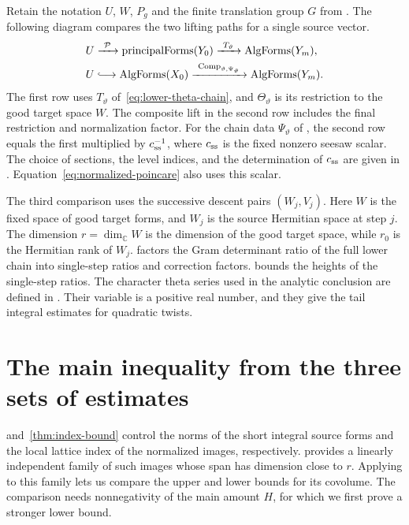 Retain the notation $U$, $W$, $P_g$ and the finite translation group $G$ from . The following diagram compares the two lifting paths for a single source vector.
\begin{equation}
\label{eq:lift-comparison}
\begin{aligned}
 U &\xrightarrow{\ \mathcal P\ }\operatorname{principalForms}(Y_0)
     \xrightarrow{\ T_\vartheta\ }\operatorname{AlgForms}(Y_m),\\
 U &\lhook\joinrel\longrightarrow \operatorname{AlgForms}(X_0)
     \xrightarrow{\ \operatorname{Comp}_{\vartheta,\Psi_\vartheta}\ }
        \operatorname{AlgForms}(Y_m).
\end{aligned}
\end{equation}
The first row uses $T_\vartheta$ of~\eqref{eq:lower-theta-chain}, and $\Theta_\vartheta$ is its restriction to the good target space $W$. The composite lift in the second row includes the final restriction and normalization factor. For the chain data $\Psi_\vartheta$ of , the second row equals the first multiplied by $c_{\rm ss}^{-1}$, where $c_{\rm ss}$ is the fixed nonzero seesaw scalar. The choice of sections, the level indices, and the determination of $c_{\rm ss}$ are given in . Equation~\eqref{eq:normalized-poincare} also uses this scalar.

The third comparison uses the successive descent pairs $(W_j,V_j)$. Here $W$ is the fixed space of good target forms, and $W_j$ is the source Hermitian space at step $j$. The dimension $r=\dim_{\mathbb C}W$ is the dimension of the good target space, while $r_0$ is the Hermitian rank of $W_j$.  factors the Gram determinant ratio of the full lower chain into single-step ratios and correction factors.  bounds the heights of the single-step ratios. The character theta series used in the analytic conclusion are defined in . Their variable is a positive real number, and they give the tail integral estimates for quadratic twists.

\section{The main inequality from the three sets of estimates}
\label{sec:main-inequality}

 and~\ref{thm:index-bound} control the norms of the short integral source forms and the local lattice index of the normalized images, respectively.  provides a linearly independent family of such images whose span has dimension close to $r$. Applying  to this family lets us compare the upper and lower bounds for its covolume. The comparison needs nonnegativity of the main amount $H$, for which we first prove a stronger lower bound.

